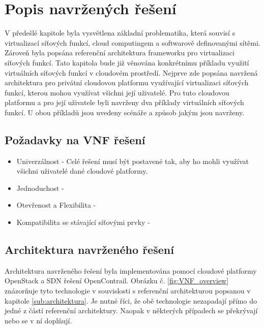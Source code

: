 \chapter{Popis navržených řešení}

V předešlé kapitole byla vysvětlena základní problematika, která souvisí s virtualizací síťových funkcí, cloud computingem a softwarově definovanými sítěmi. Zároveň byla popsána referenční architektura frameworku pro virtualizaci síťových funkcí. Tato kapitola bude již věnována konkrétnímu příkladu využití virtuálních síťových funkcí v cloudovém prostředí. Nejprve zde popsána navržená architektura pro privátní cloudovou platformu využívající virtualizaci síťových funkcí, kterou mohou využívat všichni její uživatelé. Pro tuto cloudovou platformu a pro její uživatele byli navrženy dva příklady virtuálních síťových funkcí. U obou příkladů jsou uvedeny scénáře a způsob jakým jsou navrženy.

\section{Požadavky na VNF řešení}

\begin{itemize}
\item Univerzálnost - Celé řešení musí být postavené tak, aby ho mohli využívat všichni uživatelé dané cloudové platformy. 
\item Jednoduchost - 
\item Otevřenost a Flexibilita - 
\item Kompatibilita se stávající síťovými prvky - 
\end{itemize}

\section{Architektura navrženého řešení}

Architektura navrženého řešení byla implementována pomocí cloudové platformy OpenStack a SDN řešení OpenContrail. Obrázku č. \ref{fig:VNF_overview} znázorňuje tyto technologie v souvislosti s referenční architekturou popsanou v kapitole \ref{sub:architektura}. Je nutné říci, že obě technologie nezapadají přímo do jedné z částí referenční architektury. Naopak v některých případech se překrývají nebo se v ní doplňují.

